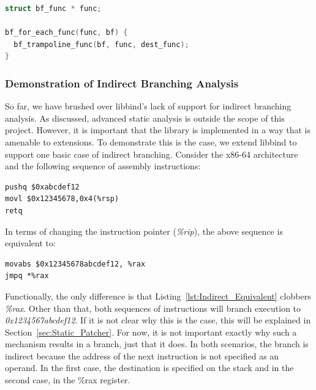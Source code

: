 \noindent\begin{minipage}{\textwidth}
\begin{lstlisting}[language=C,caption={Iterating all bf\_func objects.}]
struct bf_func * func;

bf_for_each_func(func, bf) {
  bf_trampoline_func(bf, func, dest_func);
}
\end{lstlisting}
\end{minipage}

\subsubsection{Demonstration of Indirect Branching Analysis}

So far, we have brushed over libbind's lack of support for indirect branching analysis. As discussed, advanced static analysis is outside the scope of this project. However, it is important that the library is implemented in a way that is amenable to extensions. To demonstrate this is the case, we extend libbind to support one basic case of indirect branching. Consider the x86-64 architecture and the following sequence of assembly instructions:

\noindent\begin{minipage}{\textwidth}
\begin{lstlisting}[language={[x86masm]Assembler},caption={Indirect branch.},mathescape=false,label={lst:Indirect_Branch}]
pushq $0xabcdef12
movl $0x12345678,0x4(%rsp)
retq
\end{lstlisting}
\end{minipage}

In terms of changing the instruction pointer (\emph{\%rip}), the above sequence is equivalent to:

\noindent\begin{minipage}{\textwidth}
\begin{lstlisting}[language={[x86masm]Assembler},caption={Changes the instruction pointer equivalently to Listing~\ref{lst:Indirect_Branch}.},mathescape=false,label={lst:Indirect_Equivalent}]
movabs $0x12345678abcdef12, %rax
jmpq *%rax
\end{lstlisting}
\end{minipage}

Functionally, the only difference is that Listing~\ref{lst:Indirect_Equivalent} clobbers \emph{\%rax}. Other than that, both sequences of instructions will branch execution to \emph{0x1234567abcdef12}. If it is not clear why this is the case, this will be explained in Section~\ref{sec:Static_Patcher}. For now, it is not important exactly why such a mechanism results in a branch, just that it does. In both scenarios, the branch is indirect because the address of the next instruction is not specified as an operand. In the first case, the destination is specified on the stack and in the second case, in the \%rax register.

